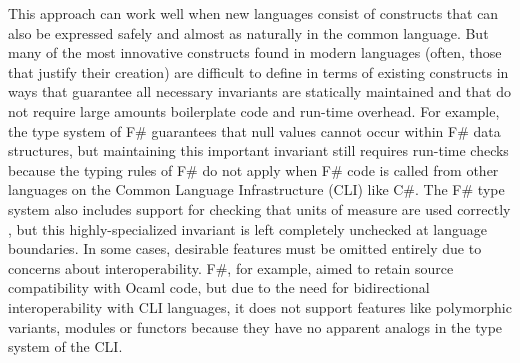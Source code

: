 This approach can work well when new languages consist of constructs that can also be expressed safely and almost as naturally in the common language.
But many of the most innovative constructs found in modern languages (often, those that justify their creation) are difficult to define in terms of existing constructs in ways that guarantee all necessary invariants are statically maintained and that do not require large amounts boilerplate code and run-time overhead. For example, the type system of F\# guarantees that null values cannot occur within F\# data structures, but maintaining this important invariant still requires run-time checks because the typing rules of F\# do not apply when F\# code is called from other languages on the Common Language Infrastructure (CLI) like C\#. The F\# type system also includes support for checking that units of measure are used correctly \cite{syme2012expert, kennedy1994dimension}, but this highly-specialized invariant is left completely unchecked at language boundaries. 
In some cases, desirable features must be omitted entirely due to concerns about interoperability. F\#, for example, aimed to retain source compatibility with Ocaml code, but due to the need for bidirectional interoperability with CLI languages, it does not support features like polymorphic variants, modules or functors \cite{ocaml-manual} because they have no apparent analogs in the type system of the CLI.

